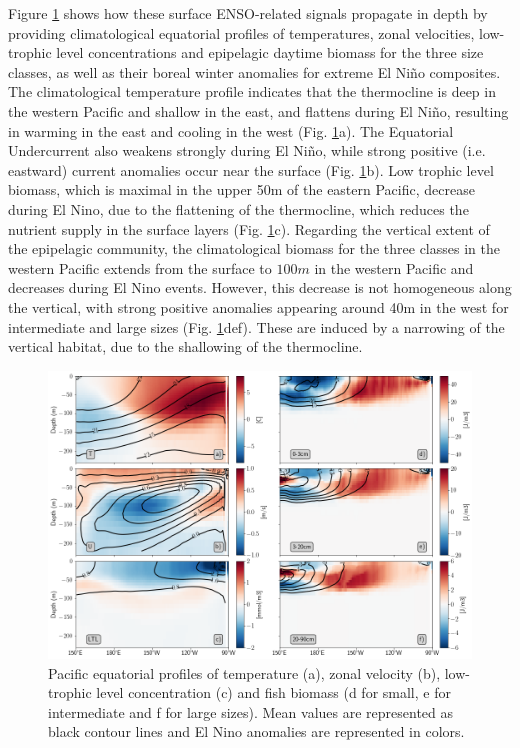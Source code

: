 Figure \ref{fig:profiles} shows how these surface ENSO-related signals propagate in depth by providing climatological equatorial profiles of temperatures, zonal velocities, low-trophic level concentrations and epipelagic daytime biomass for the three size classes, as well as their boreal winter anomalies for extreme El Niño composites. The climatological temperature profile indicates that the thermocline is deep in the western Pacific and shallow in the east, and flattens during El Niño, resulting in warming in the east and cooling in the west (Fig. \ref{fig:profiles}a). The Equatorial Undercurrent also weakens strongly during El Niño, while strong positive (i.e. eastward) current anomalies occur near the surface (Fig. \ref{fig:profiles}b). Low trophic level biomass, which is maximal in the upper 50m of the eastern Pacific, decrease during El Nino, due to the flattening of the thermocline, which reduces the nutrient supply in the surface layers (Fig. \ref{fig:profiles}c). Regarding the vertical extent of the epipelagic community, the climatological biomass for the three classes in the western Pacific extends from the surface to $100m$ in the western Pacific and decreases during El Nino events. However, this decrease is not homogeneous along the vertical, with strong positive anomalies appearing around 40m in the west for intermediate and large sizes (Fig. \ref{fig:profiles}def). These are induced by a narrowing of the vertical habitat, due to the shallowing of the thermocline. 

\begin{figure}[h!tp]
	\centering
	\includegraphics[scale=0.4]{figs/forage_mean_ond97.png}	
	\caption{Pacific equatorial profiles of temperature (a), zonal velocity (b), low-trophic level concentration (c) and fish biomass (d for small, e for intermediate and f for large sizes). Mean values are represented as black contour lines and El Nino anomalies are represented in colors.}	
	\label{fig:profiles}
\end{figure}

